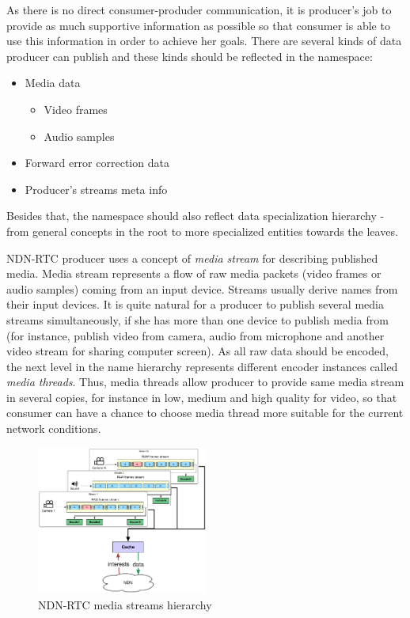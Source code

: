 \documentclass[10pt]{icn/sig-alternate-10pt} %
\newcommand{\ndnrtcName}{NDN-RTC} %
\begin{document}
As there is no direct consumer-produder communication, it is producer's job to provide as much supportive information as possible so that consumer is able to use this information in order to achieve her goals. There are several kinds of data producer can publish and these kinds should be reflected in the namespace:

\begin{itemize}
\item Media data
\begin{itemize}
\item Video frames
\item Audio samples
\end{itemize}
\item Forward error correction data
\item Producer's streams meta info
\end{itemize}

Besides that, the namespace should also reflect data specialization hierarchy - from general concepts in the root to more specialized entities towards the leaves. 

\ndnrtcName{} producer uses a concept of \textit{media stream} for describing published media. Media stream represents a flow of raw media packets (video frames or audio samples) coming from an input device. Streams usually derive names from their input devices. It is quite natural for a producer to publish several media streams simultaneously, if she has more than one device to publish media from (for instance, publish video from camera, audio from microphone and another video stream for sharing computer screen). As all raw data should be encoded, the next level in the name hierarchy represents different encoder instances called \textit{media threads}. Thus, media threads allow producer to provide same media stream in several copies, for instance in low, medium and high quality for video, so that consumer can have a chance to choose media thread more suitable for the current network conditions.

\begin{figure}[t!]
\centering
\includegraphics[width=0.5\textwidth]{streams-hierarchy}
\caption{\ndnrtcName{} media streams hierarchy}
\label{fig:stream-hierarchy}
\end{figure}
\end{document}
